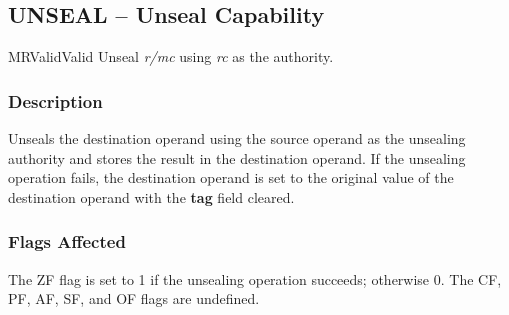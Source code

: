 \clearpage
{}
{}
\subsection*{UNSEAL -- Unseal Capability}

\begin{x86opcodetable}
  {MR}{Valid}{Valid}
  {Unseal \emph{r/mc} using \emph{rc} as the authority.}
\end{x86opcodetable}

\begin{x86opentable}
\end{x86opentable}

\subsubsection*{Description}

Unseals the destination operand using the source operand as the
unsealing authority and stores the result in the destination operand.
If the unsealing operation fails, the destination operand is set to
the original value of the destination operand with the \textbf{tag}
field cleared.

\subsubsection*{Flags Affected}

The ZF flag is set to 1 if the unsealing operation succeeds; otherwise
0.  The CF, PF, AF, SF, and OF flags are undefined.
